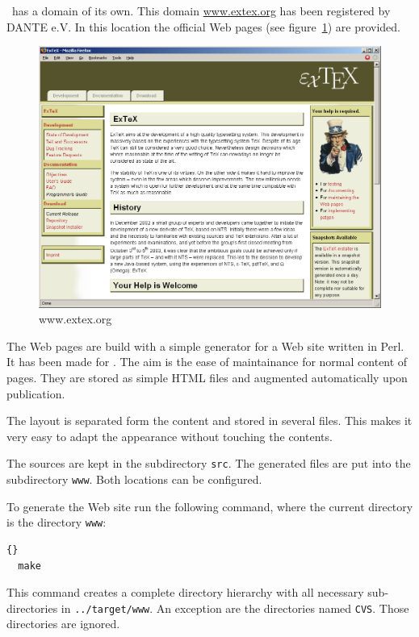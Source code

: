 \documentclass{extex-doc}
\begin{document}
\ExTeX\ has a domain of its own. This domain \url{www.extex.org} has
been registered by DANTE e.V. In this location the official Web pages
(see figure~\ref{fig:www-extex-org}) are provided.
\begin{figure}[htb]
  \centering
  \includegraphics[scale=.4]{image/www-extex-org}
  \caption{www.extex.org}\label{fig:www-extex-org}
\end{figure}

The Web pages are build with a simple generator for a Web site written
in Perl. It has been made for \ExTeX. The aim is the ease of
maintainance for normal content of pages. They are stored as simple
HTML files and augmented automatically upon publication.

The layout is separated form the content and stored in several files.
This makes it very easy to adapt the appearance without touching the
contents.

The sources are kept in the subdirectory \texttt{src}. The generated
files are put into the subdirectory \texttt{www}. Both locations can
be configured.

To generate the Web site run the following command, where the current
directory is the directory \texttt{www}:

\begin{lstlisting}{}
  make
\end{lstlisting}{}

This command creates a complete directory hierarchy with all necessary
sub-di\-rec\-to\-ries in \texttt{../target/www}. An exception are the
directories named \texttt{CVS}. Those directories are ignored.
\end{document}
